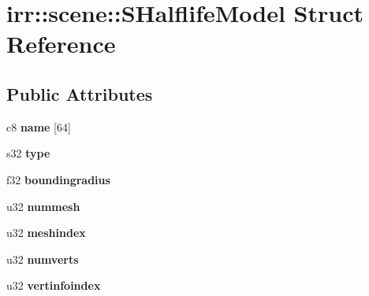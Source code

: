 \hypertarget{structirr_1_1scene_1_1_s_halflife_model}{\section{irr\-:\-:scene\-:\-:S\-Halflife\-Model Struct Reference}
\label{structirr_1_1scene_1_1_s_halflife_model}
}
\subsection*{Public Attributes}
\begin{DoxyCompactItemize}
\item 
\hypertarget{structirr_1_1scene_1_1_s_halflife_model_aa7c56da8668be6754df64d453c6e49c1}{c8 {\bfseries name} \mbox{[}64\mbox{]}}\label{structirr_1_1scene_1_1_s_halflife_model_aa7c56da8668be6754df64d453c6e49c1}

\item 
\hypertarget{structirr_1_1scene_1_1_s_halflife_model_a9e05ef0b8498af44b3f7c9d71adeebd9}{s32 {\bfseries type}}\label{structirr_1_1scene_1_1_s_halflife_model_a9e05ef0b8498af44b3f7c9d71adeebd9}

\item 
\hypertarget{structirr_1_1scene_1_1_s_halflife_model_ab3ac01ea993f94fdf8a5b69079040f61}{f32 {\bfseries boundingradius}}\label{structirr_1_1scene_1_1_s_halflife_model_ab3ac01ea993f94fdf8a5b69079040f61}

\item 
\hypertarget{structirr_1_1scene_1_1_s_halflife_model_a8f2f7ba99beba4f2a9c222fdcf0a9409}{u32 {\bfseries nummesh}}\label{structirr_1_1scene_1_1_s_halflife_model_a8f2f7ba99beba4f2a9c222fdcf0a9409}

\item 
\hypertarget{structirr_1_1scene_1_1_s_halflife_model_a26536c68c23d391c53422b1b87796446}{u32 {\bfseries meshindex}}\label{structirr_1_1scene_1_1_s_halflife_model_a26536c68c23d391c53422b1b87796446}

\item 
\hypertarget{structirr_1_1scene_1_1_s_halflife_model_acda12d3c71580f031677c7a36cc58c77}{u32 {\bfseries numverts}}\label{structirr_1_1scene_1_1_s_halflife_model_acda12d3c71580f031677c7a36cc58c77}

\item 
\hypertarget{structirr_1_1scene_1_1_s_halflife_model_a01cb1ec824778d0fe4f2fea9b2102520}{u32 {\bfseries vertinfoindex}}\label{structirr_1_1scene_1_1_s_halflife_model_a01cb1ec824778d0fe4f2fea9b2102520}


\end{DoxyCompactItemize}
